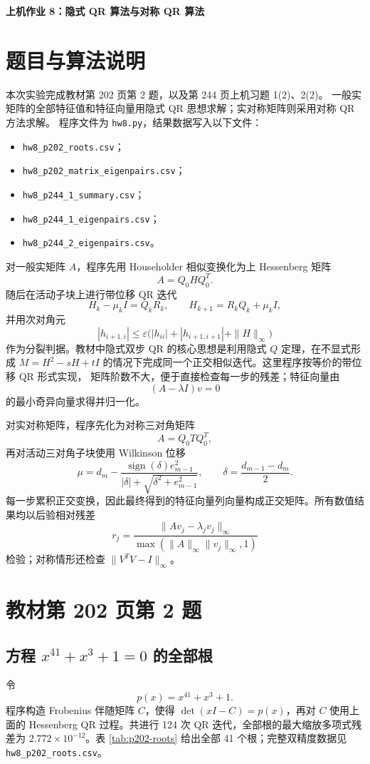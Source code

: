 \documentclass[a4paper,11pt]{article}
\newcommand{\file}[1]{\texttt{\small #1}}
\begin{document}
\begin{center}
    \Large\textbf{上机作业 8：隐式 QR 算法与对称 QR 算法}
\end{center}

\section{题目与算法说明}
本次实验完成教材第 202 页第 2 题，以及第 244 页上机习题 1(2)、2(2)。
一般实矩阵的全部特征值和特征向量用隐式 QR 思想求解；实对称矩阵则采用对称 QR 方法求解。
程序文件为 \file{hw8.py}，结果数据写入以下文件：
\begin{itemize}
    \item \file{hw8\_p202\_roots.csv}；
    \item \file{hw8\_p202\_matrix\_eigenpairs.csv}；
    \item \file{hw8\_p244\_1\_summary.csv}；
    \item \file{hw8\_p244\_1\_eigenpairs.csv}；
    \item \file{hw8\_p244\_2\_eigenpairs.csv}。
\end{itemize}

对一般实矩阵 $A$，程序先用 Householder 相似变换化为上 Hessenberg 矩阵
\[
    A=Q_0HQ_0^T .
\]
随后在活动子块上进行带位移 QR 迭代
\[
    H_k-\mu_k I=Q_kR_k,\qquad
    H_{k+1}=R_kQ_k+\mu_k I,
\]
并用次对角元
\[
    |h_{i+1,i}| \le \varepsilon
    \bigl(|h_{ii}|+|h_{i+1,i+1}|+\|H\|_\infty\bigr)
\]
作为分裂判据。教材中隐式双步 QR 的核心思想是利用隐式 $Q$ 定理，在不显式形成
$M=H^2-sH+tI$ 的情况下完成同一个正交相似迭代。这里程序按等价的带位移 QR 形式实现，
矩阵阶数不大，便于直接检查每一步的残差；特征向量由
\[
    (A-\lambda I)v=0
\]
的最小奇异向量求得并归一化。

对实对称矩阵，程序先化为对称三对角矩阵
\[
    A=Q_0TQ_0^T,
\]
再对活动三对角子块使用 Wilkinson 位移
\[
    \mu=d_m-\frac{\operatorname{sign}(\delta)e_{m-1}^2}
    {|\delta|+\sqrt{\delta^2+e_{m-1}^2}},\qquad
    \delta=\frac{d_{m-1}-d_m}{2}.
\]
每一步累积正交变换，因此最终得到的特征向量列向量构成正交矩阵。所有数值结果均以后验相对残差
\[
    r_j=\frac{\|Av_j-\lambda_jv_j\|_\infty}
    {\max(\|A\|_\infty\|v_j\|_\infty,1)}
\]
检验；对称情形还检查 $\|V^TV-I\|_\infty$。

\section{教材第 202 页第 2 题}
\subsection{方程 $x^{41}+x^3+1=0$ 的全部根}
令
\[
    p(x)=x^{41}+x^3+1 .
\]
程序构造 Frobenius 伴随矩阵 $C$，使得 $\det(xI-C)=p(x)$，再对 $C$ 使用上面的
Hessenberg QR 过程。共进行 124 次 QR 迭代，全部根的最大缩放多项式残差为
$2.772\times 10^{-12}$。表 \ref{tab:p202-roots} 给出全部 41 个根；完整双精度数据见
\verb|hw8_p202_roots.csv|。
\end{document}
